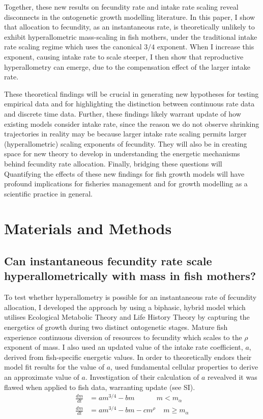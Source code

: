 \documentclass[a4paper]{article} %
\begin{document}
    Together, these new results on fecundity rate and intake rate scaling reveal disconnects in the ontogenetic growth modelling literature. In this paper, I show that allocation to fecundity, as an instantaneous rate, is theoretically unlikely to exhibit hyperallometric mass-scaling in fish mothers, under the traditional intake rate scaling regime which uses the canonical $3/4$ exponent. When I increase this exponent, causing intake rate to scale steeper, I then show that reproductive hyperallometry can emerge, due to the compensation effect of the larger intake rate.
    
    These theoretical findings will be crucial in generating new hypotheses for testing empirical data and for highlighting the distinction between continuous rate data and discrete time data. Further, these findings likely warrant update of how existing models consider intake rate, since the reason we do not observe shrinking trajectories in reality may be because larger intake rate scaling permits larger (hyperallometric) scaling exponents of fecundity. They will also be in creating space for new theory to develop in understanding the energetic mechanisms behind fecundity rate allocation. Finally, bridging these questions will  Quantifying the effects of these new findings for fish growth models will have profound implications for fisheries management and for growth modelling as a scientific practice in general.
\section{Materials and Methods}\thispagestyle{plain}
\subsection{Can instantaneous fecundity rate scale hyperallometrically with mass in fish mothers?}

To test whether hyperallometry is possible for an instantaneous rate of fecundity allocation, I developed the \cite{Charnov2001} approach by using a biphasic, hybrid model which utilises Ecological Metabolic Theory and Life History Theory by capturing the energetics of growth during two distinct ontogenetic stages. Mature fish experience continuous diversion of resources to fecundity which scales to the $\rho$ exponent of mass. I also used an updated value of the intake rate coefficient, $a$, derived from fish-specific energetic values. In order to theoretically endors their model fit results for the value of $a$, \cite{West2001} used fundamental cellular properties to derive an approximate value of $a$. Investigation of their calculation of $a$ revealved it was flawed when applied to fish data, warranting update (see SI).
\begin{align}
    \frac{dm}{dt} &= am^{3/4} - bm \ \ \ \ \ \ \ \ \ \ \ \ \ \ m < m_{\alpha} \label{luke_model_juvenile}\\
    \frac{dm}{dt} &= am^{3/4} - bm - cm^{\rho} \ \ \ \ \ m \geq m_{\alpha} \label{luke_model}
\end{align}
\end{document}
